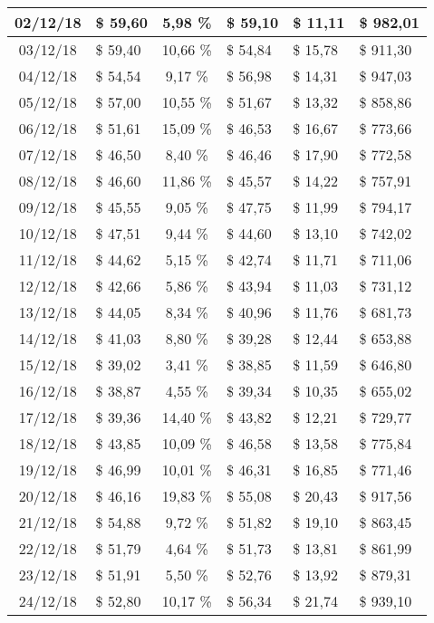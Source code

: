 \begin{center}
\begin{small}
\begin{longtable}{|c|l|c|l|l|l|}
02/12/18 & \$ 59,60 & 5,98 \% & \$ 59,10 & \$ 11,11 & \$ 982,01 \\ \hline
03/12/18 & \$ 59,40 & 10,66 \% & \$ 54,84 & \$ 15,78 & \$ 911,30 \\ \hline
04/12/18 & \$ 54,54 & 9,17 \% & \$ 56,98 & \$ 14,31 & \$ 947,03 \\ \hline
05/12/18 & \$ 57,00 & 10,55 \% & \$ 51,67 & \$ 13,32 & \$ 858,86 \\ \hline
06/12/18 & \$ 51,61 & 15,09 \% & \$ 46,53 & \$ 16,67 & \$ 773,66 \\ \hline
07/12/18 & \$ 46,50 & 8,40 \% & \$ 46,46 & \$ 17,90 & \$ 772,58 \\ \hline
08/12/18 & \$ 46,60 & 11,86 \% & \$ 45,57 & \$ 14,22 & \$ 757,91 \\ \hline
09/12/18 & \$ 45,55 & 9,05 \% & \$ 47,75 & \$ 11,99 & \$ 794,17 \\ \hline
10/12/18 & \$ 47,51 & 9,44 \% & \$ 44,60 & \$ 13,10 & \$ 742,02 \\ \hline
11/12/18 & \$ 44,62 & 5,15 \% & \$ 42,74 & \$ 11,71 & \$ 711,06 \\ \hline
12/12/18 & \$ 42,66 & 5,86 \% & \$ 43,94 & \$ 11,03 & \$ 731,12 \\ \hline
13/12/18 & \$ 44,05 & 8,34 \% & \$ 40,96 & \$ 11,76 & \$ 681,73 \\ \hline
14/12/18 & \$ 41,03 & 8,80 \% & \$ 39,28 & \$ 12,44 & \$ 653,88 \\ \hline
15/12/18 & \$ 39,02 & 3,41 \% & \$ 38,85 & \$ 11,59 & \$ 646,80 \\ \hline
16/12/18 & \$ 38,87 & 4,55 \% & \$ 39,34 & \$ 10,35 & \$ 655,02 \\ \hline
17/12/18 & \$ 39,36 & 14,40 \% & \$ 43,82 & \$ 12,21 & \$ 729,77 \\ \hline
18/12/18 & \$ 43,85 & 10,09 \% & \$ 46,58 & \$ 13,58 & \$ 775,84 \\ \hline
19/12/18 & \$ 46,99 & 10,01 \% & \$ 46,31 & \$ 16,85 & \$ 771,46 \\ \hline
20/12/18 & \$ 46,16 & 19,83 \% & \$ 55,08 & \$ 20,43 & \$ 917,56 \\ \hline
21/12/18 & \$ 54,88 & 9,72 \% & \$ 51,82 & \$ 19,10 & \$ 863,45 \\ \hline
22/12/18 & \$ 51,79 & 4,64 \% & \$ 51,73 & \$ 13,81 & \$ 861,99 \\ \hline
23/12/18 & \$ 51,91 & 5,50 \% & \$ 52,76 & \$ 13,92 & \$ 879,31 \\ \hline
24/12/18 & \$ 52,80 & 10,17 \% & \$ 56,34 & \$ 21,74 & \$ 939,10 \\ \hline

\end{longtable}
\end{small}
\end{center}
